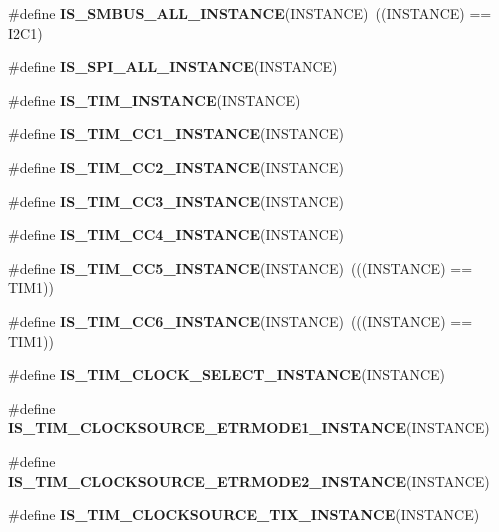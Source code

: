 \begin{DoxyCompactItemize}
\item 
\mbox{\label{group___exported__macro_gaf492fcfe71eab8d1dadf4d837b840af6}} 
\#define {\bfseries I\+S\+\_\+\+S\+M\+B\+U\+S\+\_\+\+A\+L\+L\+\_\+\+I\+N\+S\+T\+A\+N\+CE}(I\+N\+S\+T\+A\+N\+CE)~((I\+N\+S\+T\+A\+N\+CE) == I2\+C1)
\item 
\#define {\bfseries I\+S\+\_\+\+S\+P\+I\+\_\+\+A\+L\+L\+\_\+\+I\+N\+S\+T\+A\+N\+CE}(I\+N\+S\+T\+A\+N\+CE)
\item 
\#define {\bfseries I\+S\+\_\+\+T\+I\+M\+\_\+\+I\+N\+S\+T\+A\+N\+CE}(I\+N\+S\+T\+A\+N\+CE)
\item 
\#define {\bfseries I\+S\+\_\+\+T\+I\+M\+\_\+\+C\+C1\+\_\+\+I\+N\+S\+T\+A\+N\+CE}(I\+N\+S\+T\+A\+N\+CE)
\item 
\#define {\bfseries I\+S\+\_\+\+T\+I\+M\+\_\+\+C\+C2\+\_\+\+I\+N\+S\+T\+A\+N\+CE}(I\+N\+S\+T\+A\+N\+CE)
\item 
\#define {\bfseries I\+S\+\_\+\+T\+I\+M\+\_\+\+C\+C3\+\_\+\+I\+N\+S\+T\+A\+N\+CE}(I\+N\+S\+T\+A\+N\+CE)
\item 
\#define {\bfseries I\+S\+\_\+\+T\+I\+M\+\_\+\+C\+C4\+\_\+\+I\+N\+S\+T\+A\+N\+CE}(I\+N\+S\+T\+A\+N\+CE)
\item 
\mbox{\label{group___exported__macro_ga792dfa11e701c0e2dad3ed9e6b32fdff}} 
\#define {\bfseries I\+S\+\_\+\+T\+I\+M\+\_\+\+C\+C5\+\_\+\+I\+N\+S\+T\+A\+N\+CE}(I\+N\+S\+T\+A\+N\+CE)~(((I\+N\+S\+T\+A\+N\+CE) == T\+I\+M1))
\item 
\mbox{\label{group___exported__macro_ga41866b98e60d00f42889a97271d2fefa}} 
\#define {\bfseries I\+S\+\_\+\+T\+I\+M\+\_\+\+C\+C6\+\_\+\+I\+N\+S\+T\+A\+N\+CE}(I\+N\+S\+T\+A\+N\+CE)~(((I\+N\+S\+T\+A\+N\+CE) == T\+I\+M1))
\item 
\#define {\bfseries I\+S\+\_\+\+T\+I\+M\+\_\+\+C\+L\+O\+C\+K\+\_\+\+S\+E\+L\+E\+C\+T\+\_\+\+I\+N\+S\+T\+A\+N\+CE}(I\+N\+S\+T\+A\+N\+CE)
\item 
\#define {\bfseries I\+S\+\_\+\+T\+I\+M\+\_\+\+C\+L\+O\+C\+K\+S\+O\+U\+R\+C\+E\+\_\+\+E\+T\+R\+M\+O\+D\+E1\+\_\+\+I\+N\+S\+T\+A\+N\+CE}(I\+N\+S\+T\+A\+N\+CE)
\item 
\#define {\bfseries I\+S\+\_\+\+T\+I\+M\+\_\+\+C\+L\+O\+C\+K\+S\+O\+U\+R\+C\+E\+\_\+\+E\+T\+R\+M\+O\+D\+E2\+\_\+\+I\+N\+S\+T\+A\+N\+CE}(I\+N\+S\+T\+A\+N\+CE)
\item 
\#define {\bfseries I\+S\+\_\+\+T\+I\+M\+\_\+\+C\+L\+O\+C\+K\+S\+O\+U\+R\+C\+E\+\_\+\+T\+I\+X\+\_\+\+I\+N\+S\+T\+A\+N\+CE}(I\+N\+S\+T\+A\+N\+CE)

\end{DoxyCompactItemize}
